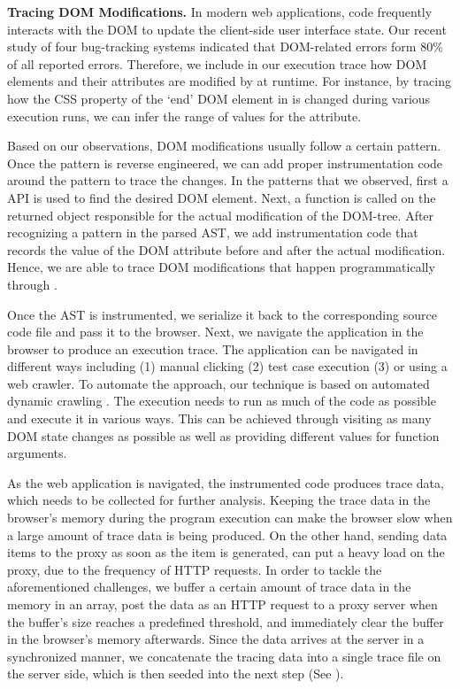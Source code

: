 {\bf Tracing DOM Modifications.} In modern web applications, \javascript code
frequently interacts with the DOM to update the client-side user interface state. Our recent study \cite{ocariza:icst12} of four bug-tracking systems indicated that DOM-related errors form 80\% of all reported \javascript errors. Therefore,  we include in our execution trace how DOM elements and their attributes are modified by \javascript at runtime. 
For instance, by tracing how the CSS property of the `end' DOM element in  is changed during various execution runs, we can infer the range of values for the  attribute. 

Based on our observations, \javascript DOM modifications usually follow a certain pattern. Once the pattern is reverse engineered, we can add proper instrumentation code around the pattern to trace the changes.
In the patterns that we observed, first a \javascript API is used to find the desired DOM element. Next, a function is called on the returned object responsible for the actual modification of the DOM-tree. After recognizing a pattern in the parsed AST, we add instrumentation code that records the value of the
DOM attribute before and after the actual modification. Hence, we are able to trace DOM modifications that happen programmatically through \javascript.

Once the AST is instrumented, we serialize it back to the corresponding \javascript source code file and pass it to the browser.
Next, we navigate the application in the browser to produce an execution trace. The application can be navigated in different ways including (1) manual clicking (2) test case execution (3) or using a web crawler. To automate the approach, our technique is based on automated dynamic crawling \cite{mesbah:tweb11}. The execution needs to run as much of the \javascript code as possible
and execute it in various ways. This can be achieved through visiting as many DOM state changes 
as possible as well as providing different values for function arguments.


As the web application is navigated, the instrumented \javascript code produces trace data, which needs to be collected for further analysis. Keeping the trace data in the browser's memory during the program execution can make the browser slow when a large amount of trace data is being produced. On the other hand, sending data items to the proxy as soon as the item is generated, can 
put a heavy load on the proxy, due to the frequency of HTTP requests.
In order to tackle the aforementioned challenges, we buffer a certain amount of trace data in the 
memory in an array, post the data as an HTTP request to a proxy server when the buffer's size reaches a predefined threshold, and immediately clear the buffer in the browser's memory afterwards. Since the data arrives at the server in a synchronized manner, we concatenate the tracing data into a single trace file on the server side, which is then seeded into the next step (See ).


